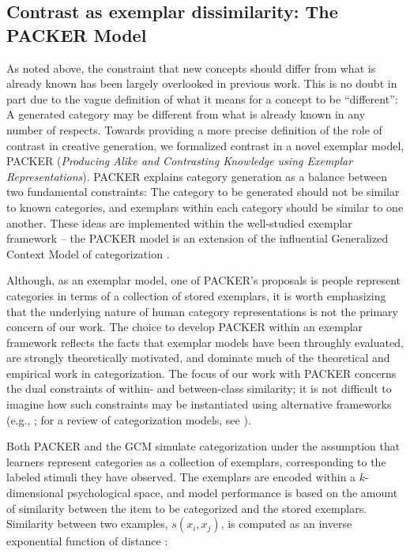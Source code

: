 \documentclass[12pt]{article}
\begin{document}
\begin{flushleft}
\subsection{Contrast as exemplar dissimilarity: The PACKER Model}

\label{section:PACKER-definition}

As noted above, the constraint that new concepts should differ from what is already known has been largely overlooked in previous work. This is no doubt in part due to the vague definition of what it means for a concept to be ``different'': A generated category may be different from what is already known in any number of respects. Towards providing a more precise definition of the role of contrast in creative generation, we formalized contrast in a novel exemplar model, PACKER  ({\em Producing Alike and Contrasting Knowledge using Exemplar Representations}). PACKER explains category generation as a balance between two fundamental constraints: The category to be generated should not be similar to known categories, and exemplars within each category should be similar to one another. These ideas are implemented within the well-studied exemplar framework -- the PACKER model is an extension of the influential Generalized Context Model of categorization \citep[GCM;][]{nosofsky1984choice,nosofsky1986attention}. 

Although, as an exemplar model, one of PACKER's proposals is people represent categories in terms of a collection of stored exemplars, it is worth emphasizing that the underlying nature of human category representations is not the primary concern of our work. The choice to develop PACKER within an exemplar framework reflects the facts that exemplar models have been throughly evaluated, are strongly theoretically motivated, and dominate much of the theoretical and empirical work in categorization. The focus of our work with PACKER concerns the dual constraints of within- and between-class similarity; it is not difficult to imagine how such constraints may be instantiated using alternative frameworks (e.g., \citealp{kurtz2007divergent,love2004sustain,smith2000thirty}; for a review of categorization models, see \citealp{pothoswills2011}).

Both PACKER and the GCM simulate categorization under the assumption that learners represent categories as a collection of exemplars, corresponding to the labeled stimuli they have observed. The exemplars are encoded within a $k$-dimensional psychological space, and model performance is based on the amount of similarity between the item to be categorized and the stored exemplars. Similarity between two examples, $s\left(x_i, x_j\right)$, is computed as an inverse exponential function of distance \citep[following][]{attneave1950,shepard1957stimulus,shepard1987toward}:


\end{flushleft}
\end{document}
